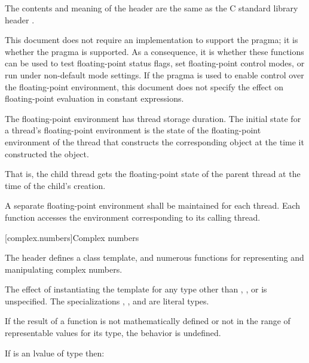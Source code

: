 \pnum
The contents and meaning of the header 
are the same as the C standard library header .
\begin{note}
This document does not require an implementation to support the
 pragma;
it is 
whether the pragma is supported. As a consequence,
it is 
whether these functions can be used to test floating-point status flags,
set floating-point control modes, or run under non-default mode settings.
If the pragma is used to enable control over the floating-point environment,
this document does not specify the effect on
floating-point evaluation in constant expressions.
\end{note}

\pnum
The floating-point environment has thread storage
duration. The initial state for a thread's floating-point
environment is the state of the floating-point environment of the thread that constructs
the corresponding  object at the time it
constructed the object. \begin{note} That is, the child thread gets the floating-point
state of the parent thread at the time of the child's creation. \end{note}

\pnum
A separate floating-point environment shall be maintained for each thread. Each function
accesses the environment corresponding to its calling thread.


[complex.numbers]{Complex numbers}

\pnum
The header
%
defines a
class template,
and numerous functions for representing and manipulating complex numbers.

\pnum
The effect of instantiating the template
for any type other than , , or  is unspecified.
The specializations
,
, and
 are literal types.

\pnum
If the result of a function is not mathematically defined or not in
the range of representable values for its type, the behavior is
undefined.

\pnum
If  is an lvalue of type \cv{}  then:

